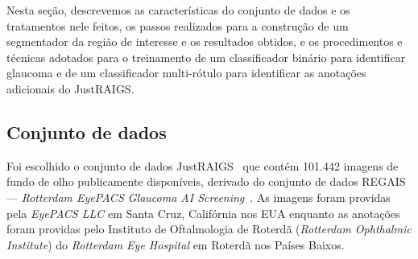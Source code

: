 \documentclass[12pt]{article}
\begin{document}
Nesta seção, descrevemos as características do conjunto de dados e os tratamentos nele feitos, os passos realizados para a construção de um segmentador da região de interesse e os resultados obtidos, e os procedimentos e técnicas adotados para o treinamento de um classificador binário para identificar glaucoma e de um classificador multi-rótulo para identificar as anotações adicionais do JustRAIGS.

\subsection{Conjunto de dados}
\label{sec:dataset}

Foi escolhido o conjunto de dados JustRAIGS~\cite{justraigs} que contém 101.442 imagens de fundo de olho publicamente disponíveis, derivado do conjunto de dados REGAIS --- \emph{Rotterdam EyePACS Glaucoma AI Screening}~\cite{justraigs_article}. As imagens foram providas pela \emph{EyePACS LLC} em Santa Cruz, Califórnia nos EUA enquanto as anotações foram providas pelo Instituto de Oftalmologia de Roterdã (\emph{Rotterdam Ophthalmic Institute}) do \emph{Rotterdam Eye Hospital} em Roterdã nos Países Baixos.


\end{document}
